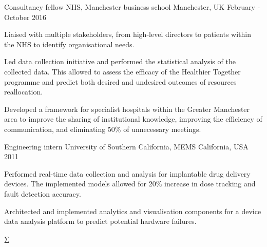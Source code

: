 \begin{cventries}

\cventry
{Consultancy fellow}
{NHS, Manchester business school}
{Manchester, UK}
{February - October 2016}
{
\begin{cvitems}
\item {Liaised with multiple stakeholders, from high-level directors to patients within the NHS to identify organisational needs.}
\item  {Led data collection initiative and performed the statistical analysis of the collected data. This allowed to assess the efficacy of the Healthier Together programme and predict both desired and undesired outcomes of resources reallocation.}
\item{Developed a framework for specialist hospitals within the Greater Manchester area to improve the sharing of institutional knowledge, improving the efficiency of communication, and eliminating 50\% of unnecessary meetings.}
\end{cvitems}
}







\cventry
{Engineering intern}
{University of Southern California, MEMS}
{California, USA}
{2011}
{
\begin{cvitems}
\item {Performed real-time data collection and analysis for implantable drug delivery devices. The implemented models allowed for 20\% increase in dose tracking and fault detection accuracy.}
\item {Architected and implemented analytics and visualisation components for a device data analysis platform to predict potential hardware failures.}
\end{cvitems}
}


\end{cventries}∑